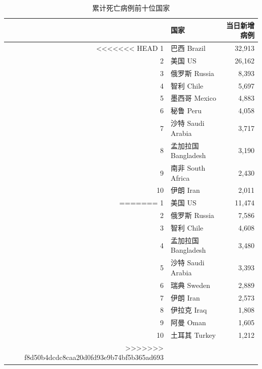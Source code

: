 \documentclass[
]{article}
\begin{document}
\begin{table}[H]
    \begin{minipage}{.4\linewidth}
    \centering
    \captionsetup{justification=centering}
    \caption{日新增病例前十位国家}
    \vspace{-0.5\baselineskip}
      \centering
    \captionsetup{justification=centering} \begin{table}[H]
\centering
\begin{tabular}{rlr}
\toprule
  & 国家 & 当日新增病例\\
\midrule
<<<<<<< HEAD
\rowcolor{gray!6}  1 & 巴西 Brazil & 32,913\\
2 & 美国 US & 26,162\\
\rowcolor{gray!6}  3 & 俄罗斯 Russia & 8,393\\
4 & 智利 Chile & 5,697\\
\rowcolor{gray!6}  5 & 墨西哥 Mexico & 4,883\\
6 & 秘鲁 Peru & 4,058\\
\rowcolor{gray!6}  7 & 沙特 Saudi Arabia & 3,717\\
8 & 孟加拉国 Bangladesh & 3,190\\
\rowcolor{gray!6}  9 & 南非 South Africa & 2,430\\
10 & 伊朗 Iran & 2,011\\
=======
\rowcolor{gray!6}  1 & 美国 US & 11,474\\
2 & 俄罗斯 Russia & 7,586\\
\rowcolor{gray!6}  3 & 智利 Chile & 4,608\\
4 & 孟加拉国 Bangladesh & 3,480\\
\rowcolor{gray!6}  5 & 沙特 Saudi Arabia & 3,393\\
6 & 瑞典 Sweden & 2,889\\
\rowcolor{gray!6}  7 & 伊朗 Iran & 2,573\\
8 & 伊拉克 Iraq & 1,808\\
\rowcolor{gray!6}  9 & 阿曼 Oman & 1,605\\
10 & 土耳其 Turkey & 1,212\\
>>>>>>> f8d50b4dcdc8caa20d0fd93e9b74bf5b365ad693
\bottomrule
\end{tabular}
\end{table} \end{minipage}
    \begin{minipage}{.6\linewidth}
    \centering
    \captionsetup{justification=centering}
     \caption{累计死亡病例前十位国家}
     \vspace{-0.5\baselineskip}
      \centering

\end{minipage}
\end{table}
\end{document}
